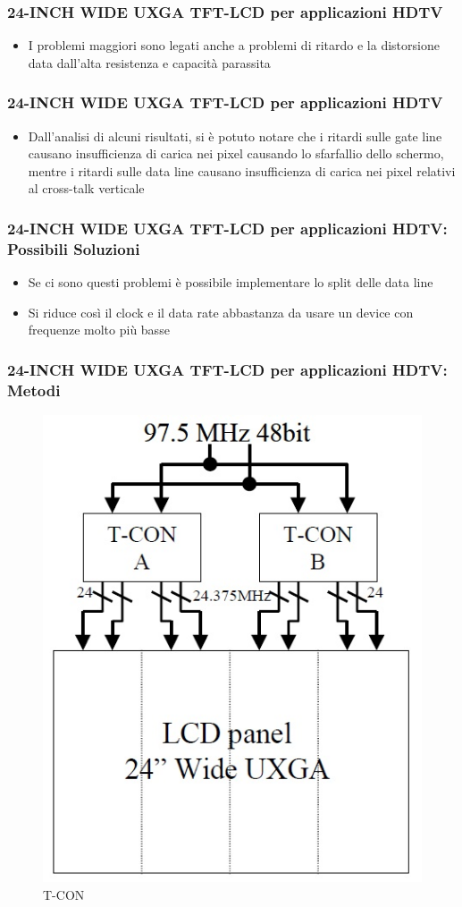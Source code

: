 \documentclass[12pt]{beamer}
\begin{document}
	\begin{frame}
		\frametitle{24-INCH WIDE UXGA TFT-LCD per applicazioni HDTV}
		\begin{itemize}
			\item I problemi maggiori sono legati anche a problemi di ritardo e la distorsione data dall'alta resistenza e capacità parassita
		\end{itemize}
	\end{frame}
	\begin{frame}
		\frametitle{24-INCH WIDE UXGA TFT-LCD per applicazioni HDTV}
		\begin{itemize}
			\item Dall’analisi di alcuni risultati, si è potuto notare che i ritardi sulle gate line  causano insufficienza di carica nei pixel causando lo sfarfallio dello schermo, mentre i ritardi sulle data line causano insufficienza di carica nei pixel relativi al cross-talk verticale
		\end{itemize}
	\end{frame}
	\begin{frame}
	\frametitle{24-INCH WIDE UXGA TFT-LCD per applicazioni HDTV:  Possibili Soluzioni}
		\begin{itemize}
			\item Se ci sono questi problemi è possibile implementare lo split delle data line
			\pause
			\item Si riduce così il clock e il data rate abbastanza
			da usare un device con frequenze molto più basse
		\end{itemize}
	\end{frame}
	\begin{frame}
		\frametitle{24-INCH WIDE UXGA TFT-LCD per applicazioni HDTV:  Metodi}
		\begin{figure}
			\centering
			\includegraphics[width=0.5\linewidth]{FISICA/T-CON}
			\caption{T-CON}
			\label{fig:t-con}
		\end{figure}
	\end{frame}
\end{document}
